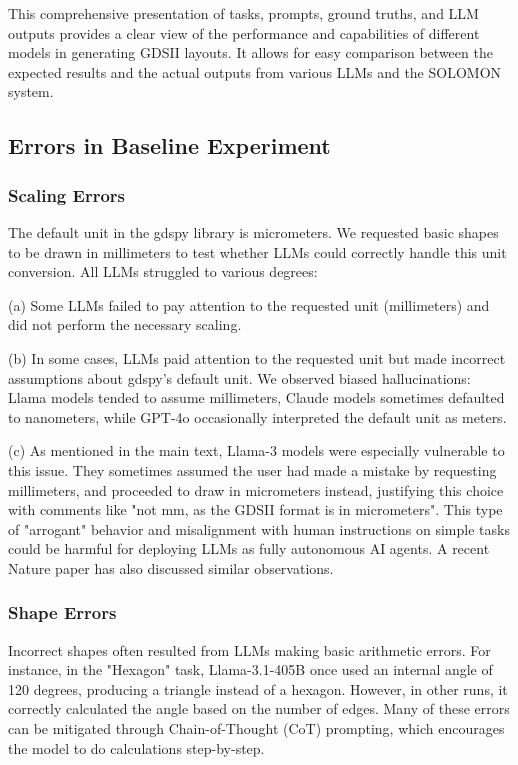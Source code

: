 \documentclass{article}
\begin{document}
This comprehensive presentation of tasks, prompts, ground truths, and LLM outputs provides a clear view of the performance and capabilities of different models in generating GDSII layouts. It allows for easy comparison between the expected results and the actual outputs from various LLMs and the SOLOMON system.

\subsection{Errors in Baseline Experiment}
\label{appendix:baseline_errors}

\subsubsection{Scaling Errors}
\label{appendix:scaling_errors}

The default unit in the gdspy library is micrometers. We requested basic shapes to be drawn in millimeters to test whether LLMs could correctly handle this unit conversion. All LLMs struggled to various degrees:

(a) Some LLMs failed to pay attention to the requested unit (millimeters) and did not perform the necessary scaling.

(b) In some cases, LLMs paid attention to the requested unit but made incorrect assumptions about gdspy's default unit. We observed biased hallucinations: Llama models tended to assume millimeters, Claude models sometimes defaulted to nanometers, while GPT-4o occasionally interpreted the default unit as meters.

(c) As mentioned in the main text, Llama-3 models were especially vulnerable to this issue. They sometimes assumed the user had made a mistake by requesting millimeters, and proceeded to draw in micrometers instead, justifying this choice with comments like "not mm, as the GDSII format is in micrometers". This type of "arrogant" behavior and misalignment with human instructions on simple tasks could be harmful for deploying LLMs as fully autonomous AI agents. A recent Nature paper \cite{ZhouNature2024} has also discussed similar observations.

\subsubsection{Shape Errors}
\label{appendix:shape_errors}

Incorrect shapes often resulted from LLMs making basic arithmetic errors. For instance, in the "Hexagon" task, Llama-3.1-405B once used an internal angle of 120 degrees, producing a triangle instead of a hexagon. However, in other runs, it correctly calculated the angle based on the number of edges. Many of these errors can be mitigated through Chain-of-Thought (CoT) prompting, which encourages the model to do calculations step-by-step.
\end{document}
